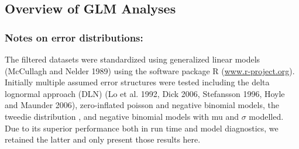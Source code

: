                                                                                        
                                                                                       
   \subsection{Overview of GLM Analyses}
   \subsubsection{Notes on error distributions:} 
   The  filtered datasets  were standardized using generalized linear models (McCullagh and Nelder 1989) using the software package R (\url{www.r-project.org}). Initially multiple assumed error structures were tested including the delta lognormal approach (DLN) (Lo et al. 1992, Dick 2006, Stefansson 1996, Hoyle and Maunder 2006), zero-inflated poisson and negative binomial models, the tweedie distribution \citep{Shono2008},%
   and negative binomial models with mu and  $\sigma$ modelled. Due to its superior performance both in run time and model diagnostics, we retained the latter and only present those results here.

